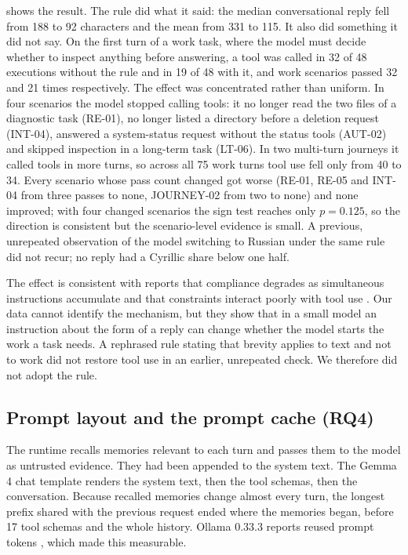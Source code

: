 \documentclass[11pt,a4paper]{article}
\begin{document}
 shows the result. The rule did what it said: the median conversational reply fell from 188 to 92 characters and the mean from 331 to 115. It also did something it did not say. On the first turn of a work task, where the model must decide whether to inspect anything before answering, a tool was called in 32 of 48 executions without the rule and in 19 of 48 with it, and work scenarios passed 32 and 21 times respectively. The effect was concentrated rather than uniform. In four scenarios the model stopped calling tools: it no longer read the two files of a diagnostic task (RE-01), no longer listed a directory before a deletion request (INT-04), answered a system-status request without the status tools (AUT-02) and skipped inspection in a long-term task (LT-06). In two multi-turn journeys it called tools in more turns, so across all 75 work turns tool use fell only from 40 to 34. Every scenario whose pass count changed got worse (RE-01, RE-05 and INT-04 from three passes to none, JOURNEY-02 from two to none) and none improved; with four changed scenarios the sign test reaches only $p=0.125$, so the direction is consistent but the scenario-level evidence is small. A previous, unrepeated observation of the model switching to Russian under the same rule did not recur; no reply had a Cyrillic share below one half.

The effect is consistent with reports that compliance degrades as simultaneous instructions accumulate \cite{multiply,decrim} and that constraints interact poorly with tool use \cite{cctu}. Our data cannot identify the mechanism, but they show that in a small model an instruction about the form of a reply can change whether the model starts the work a task needs. A rephrased rule stating that brevity applies to text and not to work did not restore tool use in an earlier, unrepeated check. We therefore did not adopt the rule.

\subsection{Prompt layout and the prompt cache (RQ4)}\label{sec:cache}
The runtime recalls memories relevant to each turn and passes them to the model as untrusted evidence. They had been appended to the system text. The Gemma 4 chat template renders the system text, then the tool schemas, then the conversation. Because recalled memories change almost every turn, the longest prefix shared with the previous request ended where the memories began, before 17 tool schemas and the whole history. Ollama 0.33.3 reports reused prompt tokens \cite{ollama}, which made this measurable.
\end{document}
